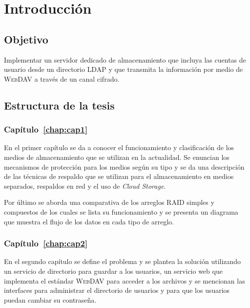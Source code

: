 \cleardoublepage  
{}
\chapter*{Introducci\'{o}n}
\label{chap:intro}

  \section*{Objetivo}

Implementar un servidor dedicado de almacenamiento que incluya las cuentas de usuario desde un directorio \textsc{LDAP} y que transmita la informaci\'{o}n por medio de \textsc{WebDAV} a trav\'{e}s de un canal cifrado.

  \section*{Estructura de la tesis}

    \subsection*{Cap\'{i}tulo~\ref{chap:cap1}}

En el primer cap\'{i}tulo se da a conocer el funcionamiento y clasificaci\'{o}n de los medios de almacenamiento que se utilizan en la actualidad. Se enuncian los mecanismos de protecci\'{o}n para los medios seg\'{u}n su tipo y se da una descripci\'{o}n de las t\'{e}cnicas de respaldo que se utilizan para el almacenamiento en medios separados, respaldos en red y el uso de \textit{Cloud Storage}.

Por \'{u}ltimo se aborda una comparativa de los arreglos RAID simples y compuestos de los cuales se lista su funcionamiento y se presenta un diagrama que muestra el flujo de los datos en cada tipo de arreglo.

    \subsection*{Cap\'{i}tulo~\ref{chap:cap2}}

En el segundo cap\'{i}tulo se define el problema y se plantea la soluci\'{o}n utilizando un servicio de directorio para guardar a los usuarios, un servicio web que implementa el est\'{a}ndar \textsc{WebDAV} para acceder a los archivos y se mencionan las interfaces para administrar el directorio de usuarios y para que los usuarios puedan cambiar su contrase\~{n}a.

